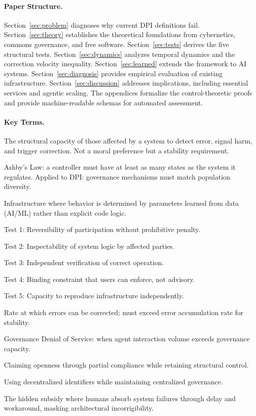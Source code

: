 \documentclass{article}
\begin{document}
\paragraph{Paper Structure.} Section~\ref{sec:problem} diagnoses why current DPI definitions fail. Section~\ref{sec:theory} establishes the theoretical foundations from cybernetics, commons governance, and free software. Section~\ref{sec:tests} derives the five structural tests. Section~\ref{sec:dynamics} analyzes temporal dynamics and the correction velocity inequality. Section~\ref{sec:learned} extends the framework to AI systems. Section~\ref{sec:diagnosis} provides empirical evaluation of existing infrastructure. Section~\ref{sec:discussion} addresses implications, including essential services and agentic scaling. The appendices formalize the control-theoretic proofs and provide machine-readable schemas for automated assessment.

\paragraph{Key Terms.}
\begin{description}[style=nextline, leftmargin=1.5em, font=\normalfont\bfseries]
\item[Corrigibility] The structural capacity of those affected by a system to detect error, signal harm, and trigger correction. Not a moral preference but a stability requirement.
\item[Requisite Variety] Ashby's Law: a controller must have at least as many states as the system it regulates. Applied to DPI: governance mechanisms must match population diversity.
\item[Learned Systems] Infrastructure where behavior is determined by parameters learned from data (AI/ML) rather than explicit code logic.
\item[EXIT] Test 1: Reversibility of participation without prohibitive penalty.
\item[CODE] Test 2: Inspectability of system logic by affected parties.
\item[AUDIT] Test 3: Independent verification of correct operation.
\item[GOVERN] Test 4: Binding constraint that users can enforce, not advisory.
\item[FORK] Test 5: Capacity to reproduce infrastructure independently.
\item[Correction Velocity] Rate at which errors can be corrected; must exceed error accumulation rate for stability.
\item[GDoS] Governance Denial of Service: when agent interaction volume exceeds governance capacity.
\item[Open-washing] Claiming openness through partial compliance while retaining structural control.
\item[DID-washing] Using decentralized identifiers while maintaining centralized governance.
\item[Human Friction Buffer] The hidden subsidy where humans absorb system failures through delay and workaround, masking architectural incorrigibility.
\end{description}
\end{document}
